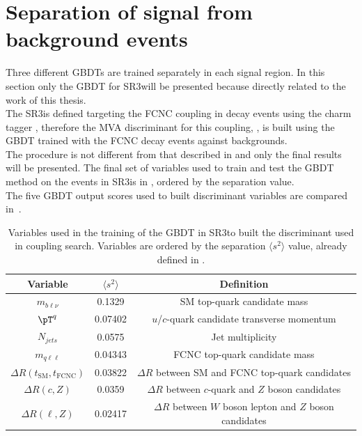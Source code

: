 \section{Separation of signal from background events}
\label{sec:separation_all}
Three different GBDTs are trained separately in each signal region.
In this section only the GBDT for SR3\tZc will be presented because directly related to the work of this thesis.\\
The SR3\tZc is defined targeting the FCNC \tZc coupling in \ttbar decay events using the charm tagger \DLrc, therefore the MVA discriminant for this coupling, \Dthree, is built using the GBDT trained with the FCNC \tZc \ttbar decay events against backgrounds.\\
The procedure is not different from that described in  and only the final results will be presented.
The final set of variables used to train and test the GBDT method on the events in
SR3\tZc is in , ordered by the separation value.\\
The five GBDT output scores used to built discriminant variables are compared in~.\\
\begin{table}[!htbp]
	\small
	\centering
	\begin{tabular}{ccc}
		\toprule
		Variable & $\langle s^{2}\rangle$  & Definition \\
		\midrule
		$m_{b\ell\nu}$  &  0.1329  &  SM top-quark candidate mass  \\
		$\pT^{q}$  &  0.07402  &  $u$/$c$-quark candidate transverse momentum  \\
		$N_{jets}$  &  0.0575  &  Jet multiplicity  \\
		$m_{q\ell\ell}$  &  0.04343  &  FCNC top-quark candidate mass  \\
		$\Delta R(t_{\text{SM}},t_{\text{FCNC}})$  &  0.03822  &  $\Delta R$ between SM and FCNC top-quark candidates  \\
		$\Delta R(c,Z)$  &  0.0359  &  $\Delta R$ between $c$-quark and $Z$ boson candidates  \\
		$\Delta R(\ell,Z)$  &  0.02417  &  $\Delta R$ between $W$ boson lepton and $Z$ boson candidates  \\
		\bottomrule
	\end{tabular}
	\caption{ Variables used in the training of the GBDT in SR3\tZc to built the \Dthree discriminant used in \tZc coupling search. Variables are ordered by the separation 	$\langle s^{2}\rangle$ value, already defined in . }%
\label{tab:D3input_dl1rc}
\end{table}


